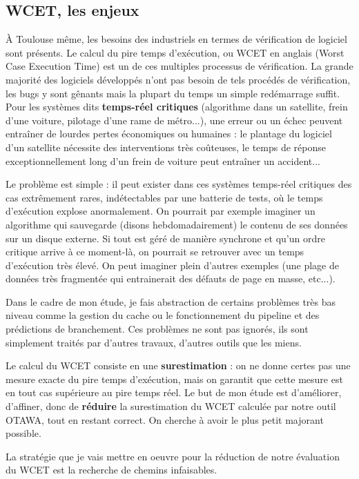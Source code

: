 \documentclass[french]{article}
\begin{document}
  \subsection{WCET, les enjeux}
  \`A Toulouse même, les besoins des industriels en termes de vérification de logiciel sont présents. Le calcul du pire temps d'exécution, ou WCET en anglais (Worst Case Execution Time) est un de ces multiples processus de vérification. La grande majorité des logiciels développés n'ont pas besoin de tels procédés de vérification, les bugs y sont gênants mais la plupart du temps un simple redémarrage suffit. Pour les systèmes dits \textbf{temps-réel critiques} (algorithme dans un satellite, frein d'une voiture, pilotage d'une rame de métro...), une erreur ou un échec peuvent entraîner de lourdes pertes économiques ou humaines : le plantage du logiciel d'un satellite nécessite des interventions très coûteuses, le temps de réponse exceptionnellement long d'un frein de voiture peut entraîner un accident...

  Le problème est simple : il peut exister dans ces systèmes temps-réel critiques des cas extrêmement rares, indétectables par une batterie de tests, où le temps d'exécution explose anormalement. On pourrait par exemple imaginer un algorithme qui sauvegarde (disons hebdomadairement) le contenu de ses données sur un disque externe. Si tout est géré de manière synchrone et qu'un ordre critique arrive à ce moment-là, on pourrait se retrouver avec un temps d'exécution très élevé. On peut imaginer plein d'autres exemples (une plage de données très fragmentée qui entrainerait des défauts de page en masse, etc...).

  Dans le cadre de mon étude, je fais abstraction de certains problèmes très bas niveau comme la gestion du cache ou le fonctionnement du pipeline et des prédictions de branchement. Ces problèmes ne sont pas ignorés, ils sont simplement traités par d'autres travaux, d'autres outils que les miens.

  Le calcul du WCET consiste en une \textbf{surestimation} : on ne donne certes pas une mesure exacte du pire temps d'exécution, mais on garantit que cette mesure est en tout cas supérieure au pire temps réel. Le but de mon étude est d'améliorer, d'affiner, donc de \textbf{réduire} la surestimation du WCET calculée par notre outil OTAWA, tout en restant correct. On cherche à avoir le plus petit majorant possible.

  La stratégie que je vais mettre en oeuvre pour la réduction de notre évaluation du WCET est la recherche de chemins infaisables.
\end{document}
